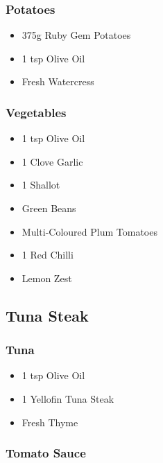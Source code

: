 \documentclass[11pt, english]{article}
\begin{document}
		\subsubsection*{Potatoes}

	\begin{itemize}
        \setlength\itemsep{0cm}
                \item 375g Ruby Gem Potatoes
		\item 1 tsp Olive Oil
		\item Fresh Watercress
        \end{itemize}

		\subsubsection*{Vegetables}

	\begin{itemize}
        \setlength\itemsep{0cm}
                \item 1 tsp Olive Oil
		\item 1 Clove Garlic
		\item 1 Shallot
		\item Green Beans
		\item Multi-Coloured Plum Tomatoes
		\item 1 Red Chilli
		\item Lemon Zest
        \end{itemize}

\newpage

	\subsection{Tuna Steak}

		\subsubsection*{Tuna}

	\begin{itemize}
        \setlength\itemsep{0cm}
                \item 1 tsp Olive Oil
		\item 1 Yellofin Tuna Steak
		\item Fresh Thyme
        \end{itemize}

		\subsubsection*{Tomato Sauce}
\end{document}
